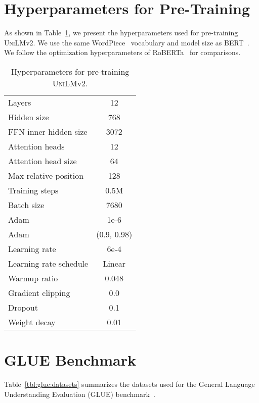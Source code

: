 \documentclass{article}
\newcommand{\bertbase}{BERT}
\newcommand{\robertabase}{RoBERTa}
\newcommand{\vtwobase}{\textsc{UniLM}v2}
\begin{document}



\clearpage
\appendix

\section{Hyperparameters for Pre-Training}

As shown in Table~\ref{tbl:pretraining_hyperparams}, we present the hyperparameters used for pre-training \vtwobase{}.
We use the same WordPiece~\cite{gnmt} vocabulary and model size as \bertbase{}~\cite{bert}.
We follow the optimization hyperparameters of \robertabase{}~\cite{roberta} for comparisons.


\begin{table}[h]
\centering
\begin{tabular}{lc}
\toprule
Layers & 12 \\
Hidden size & 768 \\
FFN inner hidden size & 3072 \\
Attention heads & 12 \\
Attention head size & 64 \\
Max relative position & 128 \\
Training steps & 0.5M \\
Batch size & 7680 \\
Adam  & 1e-6 \\
Adam  & (0.9, 0.98) \\
Learning rate & 6e-4 \\
Learning rate schedule & Linear \\
Warmup ratio & 0.048 \\
Gradient clipping & 0.0 \\
Dropout & 0.1 \\
Weight decay & 0.01 \\
\bottomrule
\end{tabular}
\caption{
Hyperparameters for pre-training \vtwobase{}.
}
\label{tbl:pretraining_hyperparams}
\end{table}


\section{GLUE Benchmark}


Table~\ref{tbl:glue:datasets} summarizes the datasets used for the General Language Understanding Evaluation (GLUE) benchmark~\cite{wang2018glue}.
\end{document}
